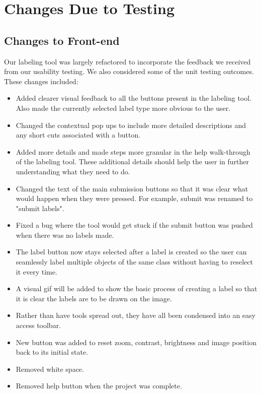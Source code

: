 \documentclass[12pt, titlepage]{article}
\begin{document}
\section{Changes Due to Testing}

\subsection{Changes to Front-end}
Our labeling tool was largely refactored to incorporate the feedback we received from our usability testing. We also considered some of the unit testing outcomes. These changes included:
\begin{itemize}
    \item Added clearer visual feedback to all the buttons present in the labeling tool. Also made the currently selected label type more obvious to the user.
    \item Changed the contextual pop ups to include more detailed descriptions and any short cuts associated with a button.
    \item Added more details and made steps more granular in the help walk-through of the labeling tool. These additional details should help the user in further understanding what they need to do.
    \item Changed the text of the main submission buttons so that it was clear what would happen when they were pressed. For example, submit was renamed to "submit labels".
    \item Fixed a bug where the tool would get stuck if the submit button was pushed when there was no labels made.
    \item The label button now stays selected after a label is created so the user can seamlessly label multiple objects of the same class without having to reselect it every time.
    \item A visual gif will be added to show the basic process of creating a label so that it is clear the labels are to be drawn on the image.
    \item Rather than have tools spread out, they have all been condensed into an easy access toolbar.
    \item New button was added to reset zoom, contrast, brightness and image position back to its initial state.
    \item Removed white space.
    \item Removed help button when the project was complete.
\end{itemize}
\end{document}
